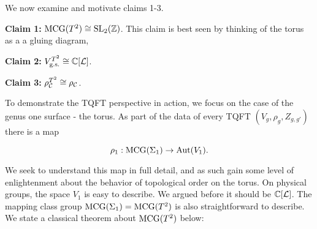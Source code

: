 We now examine and motivate claims 1-3.

\textbf{Claim 1:} $\operatorname{MCG}(T^2)\cong \operatorname{SL}_2({\mathbb Z})$. This claim is best seen by thinking of the torus as a a gluing diagram,





\textbf{Claim 2:} $V_{\text{g.s.}}^{T^2}\cong {\mathbb C}[{\mathcal L}]$.


\textbf{Claim 3:} $\rho_{{\mathcal C}}^{T^2}\cong \rho_{{\mathcal C}}$.





To demonstrate the TQFT perspective in action, we focus on the case of the genus one surface - the torus. As part of the data of every TQFT $(V_g, \rho_g, Z_{g,g'})$ there is a map

$$\rho_1:\operatorname{MCG}(\Sigma_1)\to \operatorname{Aut}(V_1).$$

We seek to understand this map in full detail, and as such gain some level of enlightenment about the behavior of topological order on the torus. On physical groups, the space $V_1$ is easy to describe. We argued before it should be ${\mathbb C}[{\mathcal L}]$. The mapping class group $\operatorname{MCG}(\Sigma_1)=\operatorname{MCG}(T^2)$ is also straightforward to describe. We state a classical theorem about $\operatorname{MCG}(T^2)$ below:


